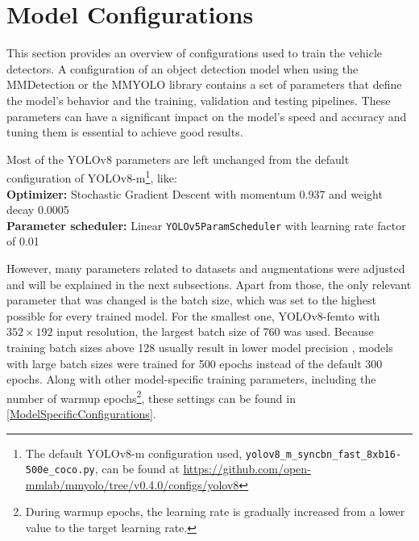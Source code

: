 \section{Model Configurations}


This section provides an overview of configurations used to train the vehicle
detectors. A configuration of an object detection model when using the
MMDetection or the MMYOLO library contains a set of parameters that define the
model's behavior and the training, validation and testing pipelines. These
parameters can have a significant impact on the model's speed and accuracy and
tuning them is essential to achieve good results.

Most of the YOLOv8 parameters are left unchanged from the default configuration
of YOLOv8-m\footnote{The default YOLOv8-m configuration used,
\texttt{yolov8\_m\_syncbn\_fast\_8xb16-500e\_coco.py}, can be found at
\url{https://github.com/open-mmlab/mmyolo/tree/v0.4.0/configs/yolov8}}, like: \\
\textbf{Optimizer:} Stochastic Gradient Descent with momentum \num{0.937} and weight decay \num{0.0005} \\
\textbf{Parameter scheduler:} Linear \verb|YOLOv5ParamScheduler| with learning rate factor of \num{0.01}

However, many parameters related to datasets and augmentations were adjusted and
will be explained in the next subsections. Apart from those, the only relevant
parameter that was changed is the batch size, which was set to the highest
possible for every trained model. For the smallest one, YOLOv8-femto with $352
\times 192$ input resolution, the largest batch size of 760 was used. Because
training batch sizes above 128 usually result in lower model precision \cite{LargeBatch}, models
with large batch sizes were trained for 500 epochs instead of the default 300
epochs. Along with other model-specific training parameters, including the
number of warmup epochs\footnote{During warmup epochs, the learning rate is
gradually increased from a lower value to the target learning rate.}, these
settings can be found in \autoref{ModelSpecificConfigurations}.


